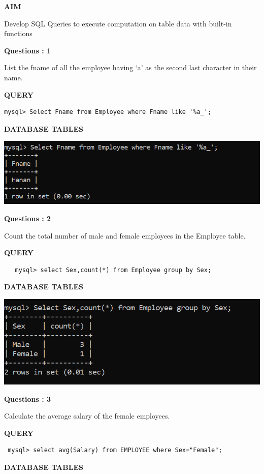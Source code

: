 \documentclass[a4paper,12pt]{report}
\begin{document}
	\begin{flushleft}
		\textbf{AIM }
	\end{flushleft} 
	   Develop SQL Queries to execute computation on table data with built-in functions
\begin{flushleft}
    \textbf{Questions : 1}
\end{flushleft}
List the fname of all the employee having ‘a’ as the second last character in their name.	
	\begin{flushleft}
		\textbf{QUERY }
	\end{flushleft}
 \begin{verbatim}
mysql> Select Fname from Employee where Fname like '%a_';
 \end{verbatim}
\begin{flushleft}
		\textbf{DATABASE TABLES} 
\end{flushleft} 

\includegraphics[scale=0.8]{fname.png}
\begin{flushleft}
    \textbf{Questions : 2}
\end{flushleft}
Count the total number of male and female employees in the Employee table.
	\begin{flushleft}
		\textbf{QUERY }
	\end{flushleft}
 \begin{verbatim}
   mysql> select Sex,count(*) from Employee group by Sex;  
 \end{verbatim}
\begin{flushleft}
		\textbf{DATABASE TABLES} 
\end{flushleft} 

\includegraphics[scale=0.8]{grpby.png}
\begin{flushleft}
    \textbf{Questions : 3}
\end{flushleft}
Calculate the average salary of  the  female employees.
	\begin{flushleft}
		\textbf{QUERY }
	\end{flushleft}
 \begin{verbatim}
 mysql> select avg(Salary) from EMPLOYEE where Sex="Female";    
 \end{verbatim}
\begin{flushleft}
		\textbf{DATABASE TABLES} 
\end{flushleft} 
\end{document}
